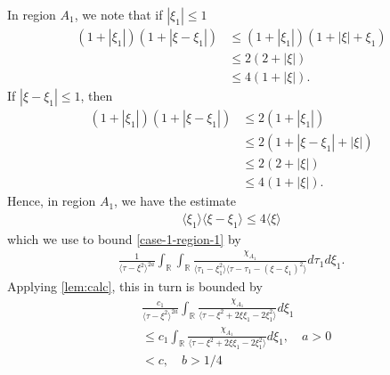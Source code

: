 \documentclass[12pt,reqno]{amsart}
\numberwithin{equation}{section}  %
\numberwithin{figure}{section}
\newcommand{\rr}{\mathbb{R}}
\theoremstyle{plain}
\theoremstyle{definition}
\theoremstyle{remark}
\begin{document}
In region $A_{1}$, we note that if $| \xi_{1} | \le 1$
%
%
%
%
\begin{equation*}
\begin{split}
  (1 + | \xi_{1} |)(1 + | \xi - \xi_{1} |)
  & \le (1 + | \xi_{1} |)(1 + | \xi | + \xi_{1})
  \\
  & \le 2 (2 + | \xi |)
  \\
  & \le 4 (1 + | \xi |).
\end{split}
\end{equation*}
%
%
If $| \xi - \xi_{1} |\le 1$, then
%
%
\begin{equation*}
\begin{split}
  (1 + | \xi_{1} |)(1 + | \xi - \xi_{1} |)
  & \le 2 (1 + | \xi_{1} |)
  \\
  & \le 2 (1 + | \xi - \xi_{1} | + | \xi |)
  \\
  & \le 2(2 + | \xi |)
  \\
  & \le 4 (1 + | \xi |).
\end{split}
\end{equation*}
%
%
Hence, in region $A_{1}$, we have the estimate
%
%
\begin{equation}
\begin{split}
  \langle \xi_{1} \rangle \langle \xi - \xi_{1} \rangle  \le 4 \langle \xi \rangle 
\end{split}
\label{splitting-estimate}
\end{equation}
%
%
which we use to bound \eqref{case-1-region-1} by
%
%
%
%
\begin{equation*}
\begin{split}
    \frac{ 1}{\langle \tau - \xi^{2} \rangle ^{2a}}
    \int_{\rr} \int_{\rr} \frac{\chi_{A_{1}}}{  
    \langle \tau_{1} - \xi_{1}^{2} \rangle \langle  \tau - \tau_{1} -
    (\xi - \xi_{1})^{2} \rangle }
    d \tau_1 d \xi_{1}.
\end{split}
\end{equation*}
%
%
Applying \autoref{lem:calc}, this in turn is bounded by
%
%
\begin{equation}
  \label{uniform-bound-region-1}
\begin{split}
  & \frac{c_{1}}{\langle \tau - \xi^{2} \rangle^{2a}} \int_{\rr}
  \frac{\chi_{A_{1}}}{\langle \tau - \xi^{2} + 2 \xi \xi_{1} - 2
  \xi_{1}^{2} \rangle } d \xi_{1}
  \\
  & \le c_{1} \int_{\rr}
  \frac{\chi_{A_{1}}}{\langle \tau - \xi^{2} + 2 \xi \xi_{1} - 2
  \xi_{1}^{2} \rangle } d \xi_{1}, \quad a > 0
  \\
& < c, \quad b > 1/4
\end{split}
\end{equation}
\end{document}
